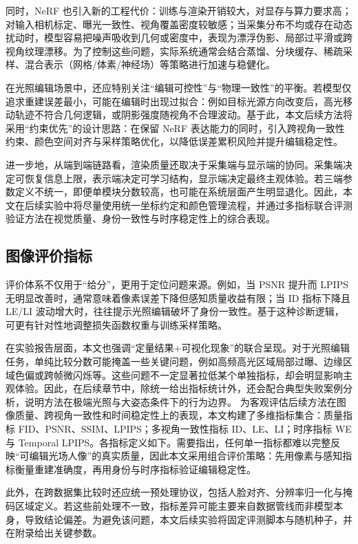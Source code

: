 同时，NeRF 也引入新的工程代价：训练与渲染开销较大，对显存与算力要求高；对输入相机标定、曝光一致性、视角覆盖密度较敏感；当采集分布不均或存在动态扰动时，模型容易把噪声吸收到几何或密度中，表现为漂浮伪影、局部过平滑或跨视角纹理漂移。为了控制这些问题，实际系统通常会结合蒸馏、分块缓存、稀疏采样、混合表示（网格/体素/神经场）等策略进行加速与稳健化。

在光照编辑场景中，还应特别关注“编辑可控性”与“物理一致性”的平衡。若模型仅追求重建误差最小，可能在编辑时出现过拟合：例如目标光源方向改变后，高光移动轨迹不符合几何逻辑，或阴影强度随视角不合理波动。基于此，本文后续方法将采用“约束优先”的设计思路：在保留 NeRF 表达能力的同时，引入跨视角一致性约束、颜色空间对齐与采样策略优化，以降低误差累积风险并提升编辑稳定性。

进一步地，从端到端链路看，渲染质量还取决于采集端与显示端的协同。采集端决定可恢复信息上限，表示端决定可学习结构，显示端决定最终主观体验。若三端参数定义不统一，即便单模块分数较高，也可能在系统层面产生明显退化。因此，本文在后续实验中将尽量使用统一坐标约定和颜色管理流程，并通过多指标联合评测验证方法在视觉质量、身份一致性与时序稳定性上的综合表现。

\subsection{图像评价指标}
评价体系不仅用于“给分”，更用于定位问题来源。例如，当 PSNR 提升而 LPIPS 无明显改善时，通常意味着像素误差下降但感知质量收益有限；当 ID 指标下降且 LE/LI 波动增大时，往往提示光照编辑破坏了身份一致性。基于这种诊断逻辑，可更有针对性地调整损失函数权重与训练采样策略。

在实验报告层面，本文也强调“定量结果+可视化现象”的联合呈现。对于光照编辑任务，单纯比较分数可能掩盖一些关键问题，例如高频高光区域局部过曝、边缘区域色偏或跨帧微闪烁等。这些问题不一定显著拉低某个单独指标，却会明显影响主观体验。因此，在后续章节中，除统一给出指标统计外，还会配合典型失败案例分析，说明方法在极端光照与大姿态条件下的行为边界。
为客观评估后续方法在图像质量、跨视角一致性和时间稳定性上的表现，本文构建了多维指标集合：质量指标 FID、PSNR、SSIM、LPIPS；多视角一致性指标 ID、LE、LI；时序指标 WE 与 Temporal LPIPS。各指标定义如下。需要指出，任何单一指标都难以完整反映“可编辑光场人像”的真实质量，因此本文采用组合评价策略：先用像素与感知指标衡量重建准确度，再用身份与时序指标验证编辑稳定性。

此外，在跨数据集比较时还应统一预处理协议，包括人脸对齐、分辨率归一化与掩码区域定义。若这些前处理不一致，指标差异可能主要来自数据管线而非模型本身，导致结论偏差。为避免该问题，本文后续实验将固定评测脚本与随机种子，并在附录给出关键参数。

